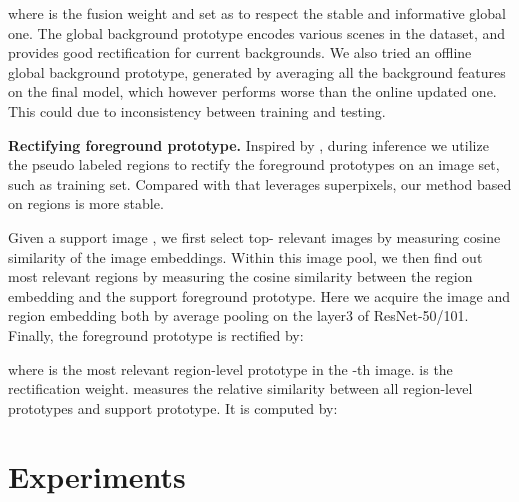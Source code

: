 \documentclass[10pt,twocolumn,letterpaper]{article}
\begin{document}
where  is the fusion weight and set as  to respect the stable and informative global one. The global background prototype encodes various scenes in the dataset, and provides good rectification for current backgrounds. We also tried an offline global background prototype, generated by averaging all the background features on the final model, which however performs worse than the online updated one. This could due to inconsistency between training and testing. 
\vspace{0.2cm}


\noindent
\textbf{Rectifying foreground prototype.} 
Inspired by \cite{liu2019prototype}, during inference we utilize the pseudo labeled regions to rectify the foreground prototypes on an image set, such as training set. Compared with \cite{liu2020part} that leverages superpixels, our method based on regions is more stable.

Given a support image , we first select top- relevant images by measuring cosine similarity of the image embeddings. Within this image pool, we then find out  most relevant regions by measuring the cosine similarity between the region embedding  and the support foreground prototype. Here we acquire the image and region embedding both by average pooling on the layer3 of ResNet-50/101. Finally, the foreground prototype is rectified by:
\vspace{-0.1cm}

where  is the most relevant region-level prototype in the -th image.  is the rectification weight.  measures the relative similarity between all region-level prototypes and support prototype. It is computed by:
\vspace{-0.15cm}

 \section{Experiments}
\end{document}
